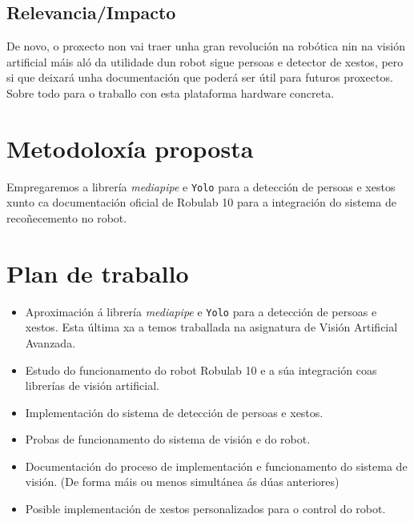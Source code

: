 \documentclass{article}
\begin{document}
\subsection{Relevancia/Impacto}

De novo, o proxecto non vai traer unha gran revolución na robótica nin na visión artificial máis aló da utilidade dun robot sigue persoas e detector de xestos, pero si que deixará unha documentación que poderá ser útil para futuros proxectos.
Sobre todo para o traballo con esta plataforma hardware concreta. 
\section{Metodoloxía proposta}
Empregaremos a librería \textit{mediapipe} e \texttt{Yolo} para a detección de persoas e xestos xunto ca documentación oficial de Robulab 10 para a integración do sistema 
de recoñecemento no robot.

\section{Plan de traballo}
\begin{itemize}
    \item Aproximación á librería \textit{mediapipe} e \texttt{Yolo} para a detección de persoas e xestos. Esta última xa a temos traballada na asignatura de Visión Artificial Avanzada.
    \item Estudo do funcionamento do robot Robulab 10 e a súa integración coas librerías de visión artificial.
    \item Implementación do sistema de detección de persoas e xestos.
    \item Probas de funcionamento do sistema de visión e do robot.
    \item Documentación do proceso de implementación e funcionamento do sistema de visión. (De forma máis ou menos simultánea ás dúas anteriores)
    \item Posible implementación de xestos personalizados para o control do robot.
\end{itemize}
\end{document}
